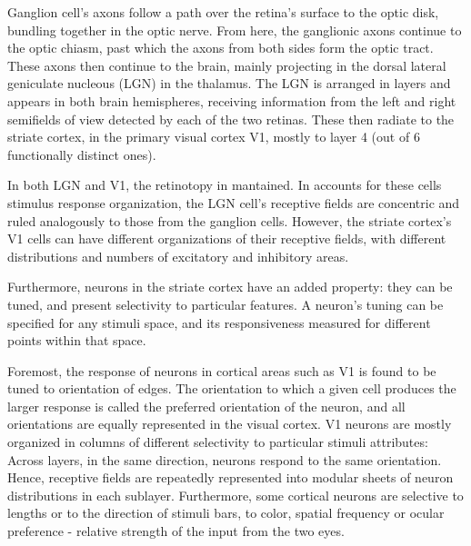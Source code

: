Ganglion cell's axons follow a path over the retina's surface to the optic disk, bundling together in the optic nerve. %
From here, the ganglionic axons continue to the optic chiasm, past which the axons from both sides form the optic tract. These axons then continue to the brain, mainly projecting in the dorsal lateral geniculate nucleous (LGN) in the thalamus. The LGN is arranged in layers and appears in both brain hemispheres,  receiving information from the left and right semifields of view detected by each of the two retinas. These then radiate to the striate cortex, in the primary visual cortex V1, mostly to layer 4 (out of 6 functionally distinct ones).


In both LGN and V1, the retinotopy in mantained.
In accounts for these cells stimulus response organization, the LGN cell's receptive fields are concentric and ruled analogously to those from the ganglion cells. 
However, the striate cortex's V1 cells can have different organizations of their receptive fields, with different distributions and numbers of excitatory and inhibitory areas. 

Furthermore, neurons in the striate cortex have an added property: they can be tuned, and present selectivity to particular features. A neuron's tuning can be specified for any stimuli space, and its responsiveness measured for different points within that space. 

Foremost, the response of neurons in cortical areas such as V1 is found to be tuned to orientation of edges. The orientation to which a given cell produces the larger response is called the preferred orientation of the neuron, and all orientations are equally represented in the visual cortex.  V1 neurons are mostly organized in columns of different selectivity to particular stimuli attributes: Across layers, in the same direction, neurons respond to the same orientation. Hence, receptive fields are repeatedly represented into modular sheets of neuron distributions in each sublayer. Furthermore, some cortical neurons are selective to lengths or to the direction of stimuli bars, to color, spatial frequency or ocular preference - relative strength of the input from the two eyes. 

